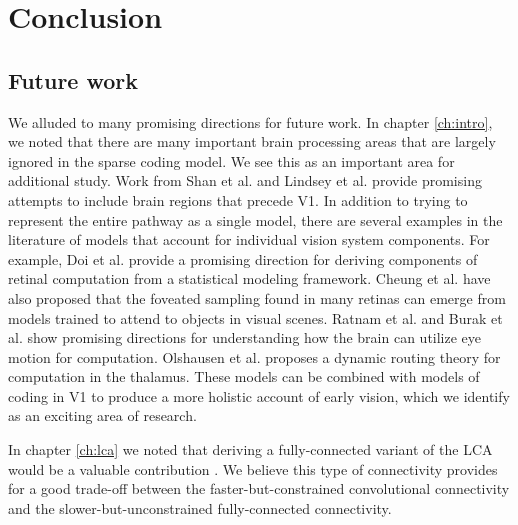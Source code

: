\chapter{Conclusion}\label{ch:conclusion}
\section{Future work}\label{sec:ch5_future_work}
We alluded to many promising directions for future work. In chapter \ref{ch:intro}, we noted that there are many important brain processing areas that are largely ignored in the sparse coding model. We see this as an important area for additional study. Work from Shan et al. \citeyearpar{shan2013efficient} and Lindsey et al. \citeyearpar{lindsey2019unified} provide promising attempts to include brain regions that precede V1. In addition to trying to represent the entire pathway as a single model, there are several examples in the literature of models that account for individual vision system components. For example, Doi et al. \citeyearpar{doi2007theory} provide a promising direction for deriving components of retinal computation from a statistical modeling framework. Cheung et al. \citeyearpar{cheung2016emergence} have also proposed that the foveated sampling found in many retinas can emerge from models trained to attend to objects in visual scenes. Ratnam et al. \citeyearpar{ratnam2017benefits} and Burak et al. \citeyearpar{burak2010bayesian} show promising directions for understanding how the brain can utilize eye motion for computation. Olshausen et al. \citeyearpar{olshausen1993neurobiological} proposes a dynamic routing theory for computation in the thalamus. These models can be combined with models of coding in V1 to produce a more holistic account of early vision, which we identify as an exciting area of research.

In chapter \ref{ch:lca} we noted that deriving a fully-connected variant of the LCA would be a valuable contribution \parencite{le2011building, ngiam2010tiled}. We believe this type of connectivity provides for a good trade-off between the faster-but-constrained convolutional connectivity and the slower-but-unconstrained fully-connected connectivity.


